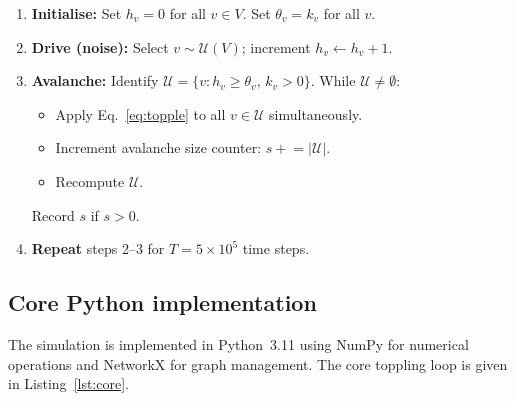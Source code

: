 \documentclass[12pt, a4paper]{article}
\begin{document}
\begin{enumerate}
  \item \textbf{Initialise:} Set $h_v=0$ for all $v\in V$.
        Set $\theta_v=k_v$ for all $v$.
  \item \textbf{Drive (noise):} Select $v\sim\mathcal{U}(V)$;
        increment $h_v\leftarrow h_v+1$.
  \item \textbf{Avalanche:} Identify
        $\mathcal{U}=\{v : h_v\geq\theta_v,\, k_v>0\}$.
        While $\mathcal{U}\neq\emptyset$:
        \begin{itemize}[noitemsep]
          \item Apply Eq.~\eqref{eq:topple} to all $v\in\mathcal{U}$
                simultaneously.
          \item Increment avalanche size counter: $s\mathrel{+}=|\mathcal{U}|$.
          \item Recompute $\mathcal{U}$.
        \end{itemize}
        Record $s$ if $s>0$.
  \item \textbf{Repeat} steps 2--3 for $T=5\times10^5$ time steps.
\end{enumerate}

\subsection{Core Python implementation}

The simulation is implemented in Python~3.11 using NumPy for
numerical operations and NetworkX for graph management.
The core toppling loop is given in Listing~\ref{lst:core}.
\end{document}
